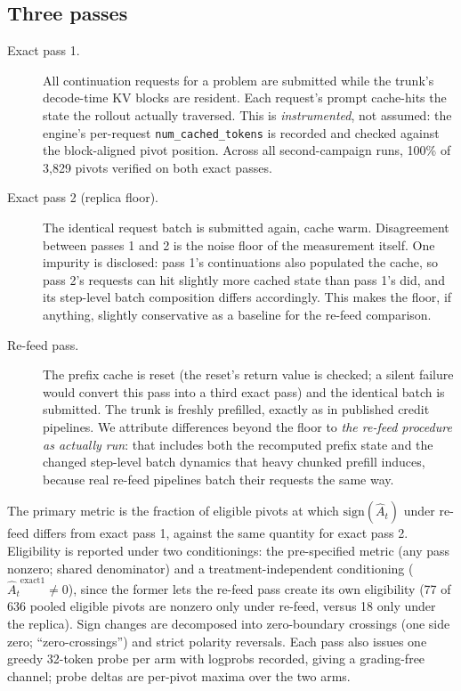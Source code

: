 \documentclass[11pt]{article}
\newcommand{\At}{\ensuremath{\hat{A}_t}\xspace}
\begin{document}
\subsection{Three passes}
\label{sec:passes}

\begin{description}
  \item[Exact pass 1.] All continuation requests for a problem are submitted
  while the trunk's decode-time KV blocks are resident. Each request's
  prompt cache-hits the state the rollout actually traversed. This is
  \emph{instrumented}, not assumed: the engine's per-request
  \texttt{num\_cached\_tokens} is recorded and checked against the
  block-aligned pivot position. Across all second-campaign runs, 100\% of
  3{,}829 pivots verified on both exact passes.
  \item[Exact pass 2 (replica floor).] The identical request batch is
  submitted again, cache warm. Disagreement between passes 1 and 2 is the
  noise floor of the measurement itself. One impurity is disclosed: pass 1's
  continuations also populated the cache, so pass 2's requests can hit
  slightly more cached state than pass 1's did, and its step-level batch
  composition differs accordingly. This makes the floor, if anything,
  slightly conservative as a baseline for the re-feed comparison.
  \item[Re-feed pass.] The prefix cache is reset (the reset's return value
  is checked; a silent failure would convert this pass into a third exact
  pass) and the identical batch is submitted. The trunk is freshly
  prefilled, exactly as in published credit pipelines. We attribute
  differences beyond the floor to \emph{the re-feed procedure as actually
  run}: that includes both the recomputed prefix state and the changed
  step-level batch dynamics that heavy chunked prefill induces, because real
  re-feed pipelines batch their requests the same way.
\end{description}

The primary metric is the fraction of eligible pivots at which
$\mathrm{sign}(\At)$ under re-feed differs from exact pass 1, against the
same quantity for exact pass 2. Eligibility is reported under two
conditionings: the pre-specified metric (any pass nonzero; shared denominator)
and a treatment-independent conditioning ($\At^{\text{exact1}} \neq 0$),
since the former lets the re-feed pass create its own eligibility (77 of 636
pooled eligible pivots are nonzero only under re-feed, versus 18 only under
the replica). Sign changes are decomposed into zero-boundary crossings
(one side zero; ``zero-crossings'') and strict polarity reversals. Each pass also issues one
greedy 32-token probe per arm with logprobs recorded, giving a grading-free
channel; probe deltas are per-pivot maxima over the two arms.
\end{document}
